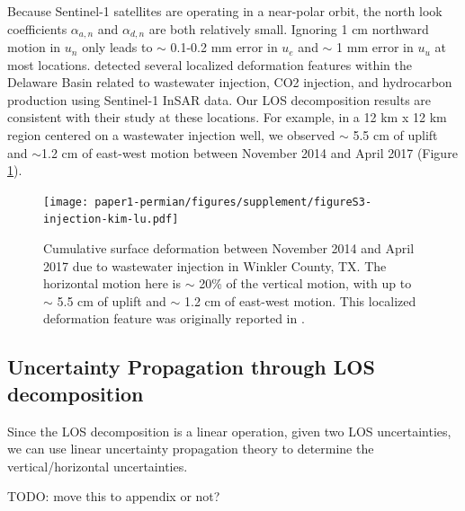 Because Sentinel-1 satellites are operating in a near-polar orbit, the north look coefficients $\alpha_{a,n}$ and $\alpha_{d,n}$ are both relatively small. Ignoring 1 cm northward motion in $u_n$ only leads to $\sim$ 0.1-0.2 mm error in $u_e$ and $\sim$ 1 mm error in $u_u$ at most locations. \cite{Kim2018AssociationLocalizedGeohazards} detected several localized deformation features within the Delaware Basin related to wastewater injection, CO2 injection, and hydrocarbon production using Sentinel-1 InSAR data.  Our LOS decomposition results are consistent with their study at these locations. For example, in a 12 km x 12 km region centered on a wastewater injection well, we observed $\sim$ 5.5 cm of uplift and $\sim$1.2 cm of east-west motion between November 2014 and April 2017 (Figure \ref{fig:injection-kim-lu}). 



\begin{figure}
	\centering
	\texttt{[image: paper1-permian/figures/supplement/figureS3-injection-kim-lu.pdf]}
	\caption[Vertical and horizontal deformation near Winkler County, TX]{Cumulative surface deformation between November 2014 and April 2017 due to wastewater injection in Winkler County, TX. The horizontal motion here is $\sim$ 20\% of the vertical motion, with up to $\sim$ 5.5 cm of uplift and $\sim$ 1.2 cm of east-west motion. This localized deformation feature was originally reported in \cite{Kim2018AssociationLocalizedGeohazards}.}
	\label{fig:injection-kim-lu}
\end{figure}




\subsection{Uncertainty Propagation through LOS decomposition}
\label{sec:ch3-decomp-uq-prop}
Since the LOS decomposition is a linear operation, given two LOS uncertainties, we can use linear uncertainty propagation theory to determine the vertical/horizontal uncertainties.

TODO: move this to appendix or not?


